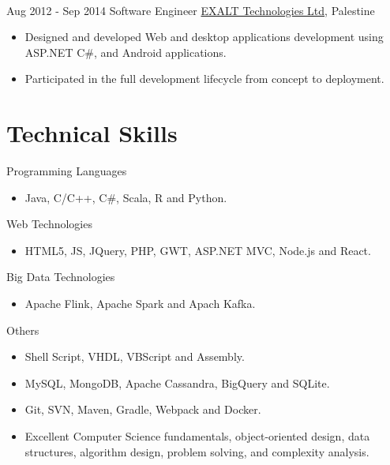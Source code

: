 \documentclass[letterpaper]{twentysecondcv} %
\begin{document}
\begin{twenty}
{{\begin{itemize}
        
    \end{itemize}}
        }
     \\
     \twentyitem
   		{Aug 2012 -}
		{Sep 2014}
        { Software Engineer}
        {}
        {\href{http://www.exalt-tech.com/about/}{EXALT Technologies Ltd}, Palestine}
        {
        \begin{itemize}
        \item Designed and developed Web and desktop applications development using ASP.NET C\#, and Android applications.
        \item Participated in the full development lifecycle from concept to deployment.
        
    \end{itemize}
    	}
        
\end{twenty}

\section{Technical  Skills}
\begin{twenty} %
	\twentyitem
	{}
	{}
	{Programming Languages}
	{}
	{}
	{ \begin{itemize}
			\item Java, C/C++, C\#, Scala, R and  Python.		
	\end{itemize}}

	\twentyitem
{}
{}
{Web Technologies}
{}
{}
{ \begin{itemize}
		\item HTML5, JS, JQuery, PHP,  GWT, ASP.NET MVC, Node.js and React.	
\end{itemize}}

		\twentyitem
	{}
	{}
	{Big Data Technologies}
	{}
	{}
	{ \begin{itemize}
			\item Apache Flink,  Apache
			Spark and Apach Kafka.		
	\end{itemize}}

		\twentyitem
{}
{}
{Others}
{}
{}
{ \begin{itemize}
		\item Shell Script, VHDL, VBScript and Assembly.	
		\item MySQL, MongoDB, Apache Cassandra, BigQuery and SQLite.
		\item Git, SVN, Maven, Gradle, Webpack and Docker.
		\item Excellent Computer Science fundamentals, object-oriented design, data structures, algorithm design, problem solving, and complexity analysis.	
\end{itemize}}



\end{twenty}
\end{document}
